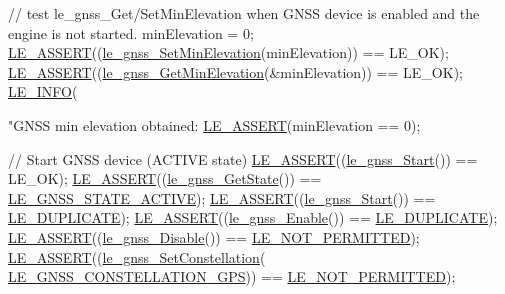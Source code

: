 \begin{DoxyCodeInclude}
{{    \textcolor{comment}{// test le\_gnss\_Get/SetMinElevation when GNSS device is enabled and the engine is not started.}
    minElevation = 0;
    \hyperlink{le__log_8h_ac0dbbef91dc0fed449d0092ff0557b39}{LE\_ASSERT}((\hyperlink{le__gnss__interface_8h_a78982eb8669530eef1bbc79ff79347e4}{le\_gnss\_SetMinElevation}(minElevation)) == LE\_OK);
    \hyperlink{le__log_8h_ac0dbbef91dc0fed449d0092ff0557b39}{LE\_ASSERT}((\hyperlink{le__gnss__interface_8h_ad8476e020a2eb0188703e78eed5818da}{le\_gnss\_GetMinElevation}(&minElevation)) == LE\_OK);
    \hyperlink{le__log_8h_a23e6d206faa64f612045d688cdde5808}{LE\_INFO}(\textcolor{stringliteral}{"GNSS min elevation obtained: %
    \hyperlink{le__log_8h_ac0dbbef91dc0fed449d0092ff0557b39}{LE\_ASSERT}(minElevation == 0);

    \textcolor{comment}{// Start GNSS device (ACTIVE state)}
    \hyperlink{le__log_8h_ac0dbbef91dc0fed449d0092ff0557b39}{LE\_ASSERT}((\hyperlink{le__gnss__interface_8h_add90639835a531c4b9d15554e4f3ba16}{le\_gnss\_Start}()) == LE\_OK);
    \hyperlink{le__log_8h_ac0dbbef91dc0fed449d0092ff0557b39}{LE\_ASSERT}((\hyperlink{le__gnss__interface_8h_a097601f67898305de45d190e857c6b55}{le\_gnss\_GetState}()) == 
      \hyperlink{le__gnss__interface_8h_a9afbfc8305e79ba6c12f89e2fe9bab7da7405696d29345255b3a5d3bfe9e410c1}{LE\_GNSS\_STATE\_ACTIVE});
    \hyperlink{le__log_8h_ac0dbbef91dc0fed449d0092ff0557b39}{LE\_ASSERT}((\hyperlink{le__gnss__interface_8h_add90639835a531c4b9d15554e4f3ba16}{le\_gnss\_Start}()) == \hyperlink{le__basics_8h_a1cca095ed6ebab24b57a636382a6c86cac26034778a666ee720b110c2fb1647ea}{LE\_DUPLICATE});
    \hyperlink{le__log_8h_ac0dbbef91dc0fed449d0092ff0557b39}{LE\_ASSERT}((\hyperlink{le__gnss__interface_8h_a8e1d96b1b64055b298a74cad1acfbbf8}{le\_gnss\_Enable}()) == \hyperlink{le__basics_8h_a1cca095ed6ebab24b57a636382a6c86cac26034778a666ee720b110c2fb1647ea}{LE\_DUPLICATE});
    \hyperlink{le__log_8h_ac0dbbef91dc0fed449d0092ff0557b39}{LE\_ASSERT}((\hyperlink{le__gnss__interface_8h_aa2cd87c616f968370e9e2113570437ea}{le\_gnss\_Disable}()) == \hyperlink{le__basics_8h_a1cca095ed6ebab24b57a636382a6c86cac6c0cac62213b786dabd7bf3e73bcec1}{LE\_NOT\_PERMITTED});
    \hyperlink{le__log_8h_ac0dbbef91dc0fed449d0092ff0557b39}{LE\_ASSERT}((\hyperlink{le__gnss__interface_8h_a6dbdc58f23e480e65ea16c583ef5340f}{le\_gnss\_SetConstellation}(
      \hyperlink{le__gnss__interface_8h_adac6fdd4f73229bc9af14e0a11335efcad8f92688bcc53bb744cb1466609d49a7}{LE\_GNSS\_CONSTELLATION\_GPS})) == \hyperlink{le__basics_8h_a1cca095ed6ebab24b57a636382a6c86cac6c0cac62213b786dabd7bf3e73bcec1}{LE\_NOT\_PERMITTED});
}}}
\end{DoxyCodeInclude}
